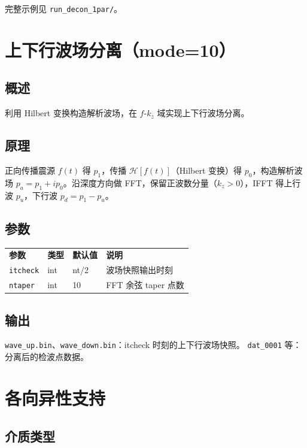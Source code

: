 \documentclass[11pt,a4paper]{ctexart}
\begin{document}
完整示例见 \texttt{run\_decon\_1par/}。


\section{上下行波场分离（mode=10）}

\subsection{概述}

利用 Hilbert 变换构造解析波场，在 $f$-$k_z$ 域实现上下行波场分离。

\subsection{原理}

正向传播震源 $f(t)$ 得 $p_1$，传播 $\mathcal{H}[f(t)]$（Hilbert 变换）得 $p_0$，构造解析波场 $p_a = p_1 + i p_0$。沿深度方向做 FFT，保留正波数分量（$k_z > 0$），IFFT 得上行波 $p_u$，下行波 $p_d = p_1 - p_u$。

\subsection{参数}

\begin{tabular}{lllp{5cm}}
\textbf{参数} & \textbf{类型} & \textbf{默认值} & \textbf{说明} \\
\texttt{itcheck} & int & nt/2 & 波场快照输出时刻 \\
\texttt{ntaper}  & int & 10 & FFT 余弦 taper 点数 \\
\end{tabular}

\subsection{输出}

\texttt{wave\_up.bin}、\texttt{wave\_down.bin}：itcheck 时刻的上下行波场快照。
\texttt{dat\_0001} 等：分离后的检波点数据。


\section{各向异性支持}

\subsection{介质类型}
\end{document}

